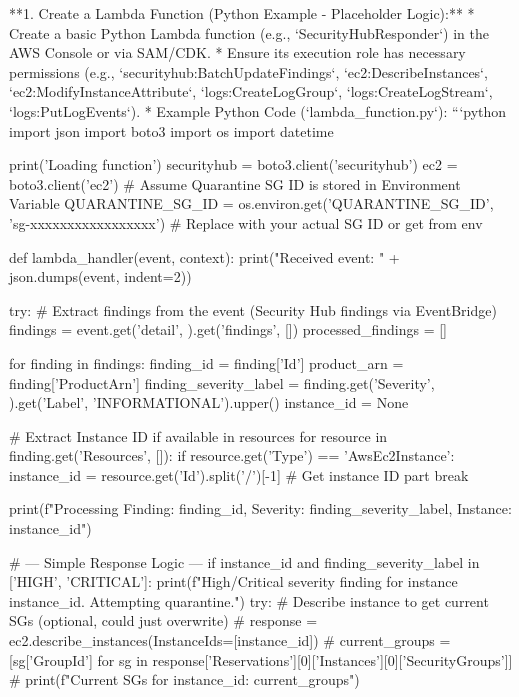 \documentclass{article}
\begin{document}
**1. Create a Lambda Function (Python Example - Placeholder Logic):**
   * Create a basic Python Lambda function (e.g., `SecurityHubResponder`) in the AWS Console or via SAM/CDK.
   * Ensure its execution role has necessary permissions (e.g., `securityhub:BatchUpdateFindings`, `ec2:DescribeInstances`, `ec2:ModifyInstanceAttribute`, `logs:CreateLogGroup`, `logs:CreateLogStream`, `logs:PutLogEvents`).
   * Example Python Code (`lambda_function.py`):
     ```python
     import json
     import boto3
     import os
     import datetime

     print('Loading function')
     securityhub = boto3.client('securityhub')
     ec2 = boto3.client('ec2')
     # Assume Quarantine SG ID is stored in Environment Variable
     QUARANTINE_SG_ID = os.environ.get('QUARANTINE_SG_ID', 'sg-xxxxxxxxxxxxxxxxx') # Replace with your actual SG ID or get from env

     def lambda_handler(event, context):
         print("Received event: " + json.dumps(event, indent=2))

         try:
             # Extract findings from the event (Security Hub findings via EventBridge)
             findings = event.get('detail', {}).get('findings', [])
             processed_findings = []

             for finding in findings:
                 finding_id = finding['Id']
                 product_arn = finding['ProductArn']
                 finding_severity_label = finding.get('Severity', {}).get('Label', 'INFORMATIONAL').upper()
                 instance_id = None

                 # Extract Instance ID if available in resources
                 for resource in finding.get('Resources', []):
                     if resource.get('Type') == 'AwsEc2Instance':
                         instance_id = resource.get('Id').split('/')[-1] # Get instance ID part
                         break

                 print(f"Processing Finding: {finding_id}, Severity: {finding_severity_label}, Instance: {instance_id}")

                 # --- Simple Response Logic ---
                 if instance_id and finding_severity_label in ['HIGH', 'CRITICAL']:
                     print(f"High/Critical severity finding for instance {instance_id}. Attempting quarantine.")
                     try:
                         # Describe instance to get current SGs (optional, could just overwrite)
                         # response = ec2.describe_instances(InstanceIds=[instance_id])
                         # current_groups = [sg['GroupId'] for sg in response['Reservations'][0]['Instances'][0]['SecurityGroups']]
                         # print(f"Current SGs for {instance_id}: {current_groups}")
\end{document}
